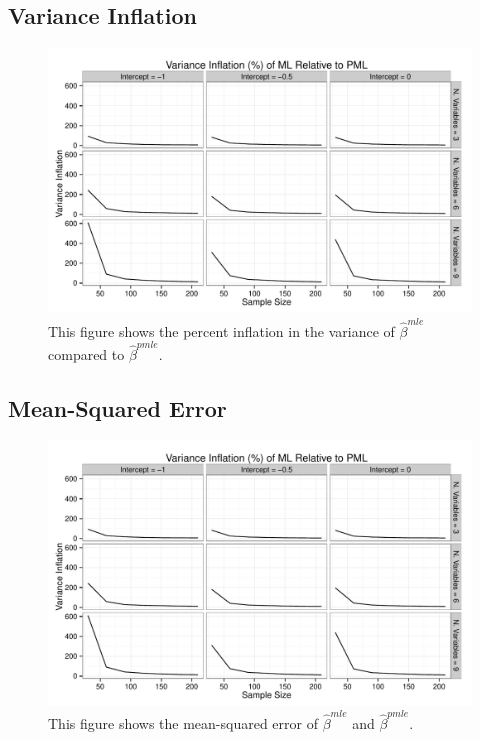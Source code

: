 \documentclass[12pt]{article}
\begin{document}
\begin{appendix}
\subsection{Variance Inflation}

\begin{figure}[H]
\begin{center}
\includegraphics[width = \textwidth]{figs/sims-var-infl.pdf}
\caption{This figure shows the percent inflation in the variance of $\hat{\beta}^{mle}$ compared to $\hat{\beta}^{pmle}$.}\label{fig:var-infl}
\end{center}
\end{figure}

\subsection{Mean-Squared Error}

\begin{figure}[H]
\begin{center}
\includegraphics[width = \textwidth]{figs/sims-var-infl.pdf}
\caption{This figure shows the mean-squared error of $\hat{\beta}^{mle}$ and $\hat{\beta}^{pmle}$.}\label{fig:mse}
\end{center}
\end{figure}


\end{appendix}
\end{document}
